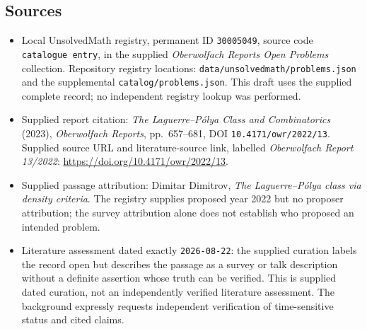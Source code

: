 \documentclass[11pt]{article}
\begin{document}
\subsection{Sources}
\begin{itemize}
\item Local UnsolvedMath registry, permanent ID \texttt{30005049}, source code \texttt{catalogue entry}, in the supplied \emph{Oberwolfach Reports Open Problems} collection. Repository registry locations: \texttt{data/unsolvedmath/problems.json} and the supplemental \texttt{catalog/problems.json}. This draft uses the supplied complete record; no independent registry lookup was performed.
\item Supplied report citation: \emph{The Laguerre--P\'olya Class and Combinatorics} (2023), \emph{Oberwolfach Reports}, pp.~657--681, DOI \texttt{10.4171/owr/2022/13}. Supplied source URL and literature-source link, labelled \emph{Oberwolfach Report 13/2022}: \url{https://doi.org/10.4171/owr/2022/13}.
\item Supplied passage attribution: Dimitar Dimitrov, \emph{The Laguerre--P\'olya class via density criteria}. The registry supplies proposed year 2022 but no proposer attribution; the survey attribution alone does not establish who proposed an intended problem.
\item Literature assessment dated exactly \texttt{2026-08-22}: the supplied curation labels the record open but describes the passage as a survey or talk description without a definite assertion whose truth can be verified. This is supplied dated curation, not an independently verified literature assessment. The background expressly requests independent verification of time-sensitive status and cited claims.
\end{itemize}
\end{document}
